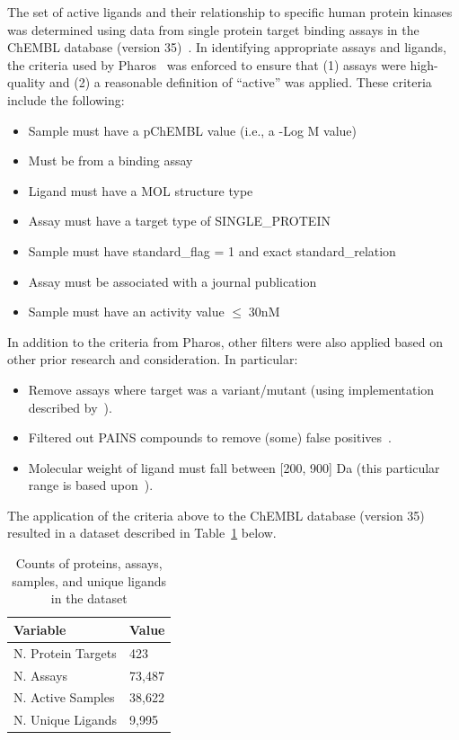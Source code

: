 \documentclass[11pt]{article}
\begin{document}
The set of active ligands and their relationship to specific human protein kinases was determined using data from single protein target binding assays in the ChEMBL database (version 35)~\cite{chembl_db_2023}. 
In identifying appropriate assays and ligands, the criteria used by Pharos~\cite{pharos_2022} was enforced to ensure that (1) assays were high-quality and (2) a reasonable definition of ``active'' was applied. 
These criteria include the following:
\begin{itemize}
    \item Sample must have a pChEMBL value (i.e., a -Log M value)
    \item Must be from a binding assay
    \item Ligand must have a MOL structure type
    \item Assay must have a target type of SINGLE\_PROTEIN
    \item Sample must have standard\_flag = 1 and exact standard\_relation
    \item Assay must be associated with a journal publication
    \item Sample must have an activity value $\leq \; 30 \text{nM}$
\end{itemize}

In addition to the criteria from Pharos, other filters were also applied based on other prior research and consideration. In particular:
\begin{itemize}
    \item Remove assays where target was a variant/mutant (using implementation described by~\cite{landrum_riniker_2024}).
    \item Filtered out PAINS compounds to remove (some) false positives~\cite{baell_holloway_2010}.
    \item Molecular weight of ligand must fall between [200, 900] Da (this particular range is based upon~\cite{filip_miljkovic_jurgen_bajorath_2018}). 
\end{itemize}

The application of the criteria above to the ChEMBL database (version 35) resulted in a dataset described in Table~\ref{tab:1} below.

\begin{table}[!ht]
\centering
\begin{tabular}{|l|l|}
    \hline
    \textbf{Variable} & \textbf{Value} \\ \hline
    N. Protein Targets & 423 \\ \hline
    N. Assays & 73,487 \\ \hline
    N. Active Samples & 38,622 \\ \hline
    N. Unique Ligands & 9,995 \\ \hline
\end{tabular}
\caption{Counts of proteins, assays, samples, and unique ligands in the dataset}\label{tab:1}
\end{table}
\end{document}
